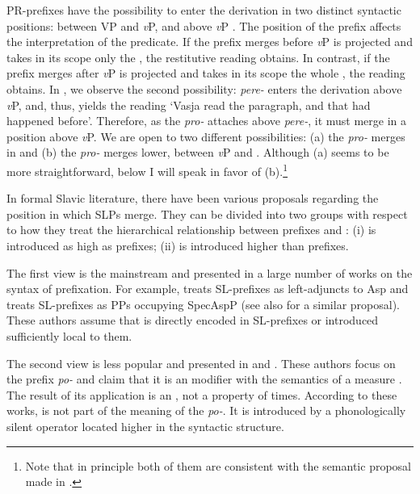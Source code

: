 \documentclass[output=paper,colorlinks,citecolor=brown,newtxmath]{langsci/langscibook}
\begin{document}
\noindent PR-prefixes have the possibility to enter the derivation in two distinct syntactic positions: between VP and \textit{v}P, and above \textit{v}P \citep{tatevosov2008intermediate}. The position of the prefix affects the interpretation of the predicate. If the prefix merges before \textit{v}P is projected and takes in its scope only the , the restitutive reading obtains. In contrast, if the prefix merges after \textit{v}P is projected and takes in its scope the whole , the  reading obtains. In , we observe the second possibility: \textit{pere-} enters the derivation above \textit{v}P, and, thus, yields the  reading `Vasja read the paragraph, and that had happened before'. Therefore, as the  \textit{pro-} attaches above \textit{pere-}, it must merge in a position above \textit{v}P. We are open to two different possibilities: (a) the  \textit{pro-} merges in  and (b) the  \textit{pro-} merges lower, between \textit{v}P and . Although (a) seems to be more straightforward, below I will speak in favor of (b).\footnote{Note that in principle both of them are consistent with the semantic proposal made in .}

In formal Slavic literature, there have been various proposals regarding the position in which SLPs merge. They can be divided into two groups with respect to how they treat the hierarchical relationship between prefixes and : (i)  is introduced as high as prefixes; (ii)  is introduced higher than prefixes.

The first view is the mainstream and presented in a large number of works on the syntax of prefixation. For example, \cite{babko1999zero} treats SL-prefixes as left-adjuncts to Asp and \cite{svenonius2004slavic} treats SL-prefixes as PPs occupying SpecAspP (see also \citealt{ramchand2005time} for a similar proposal). These authors assume that  is directly encoded in SL-prefixes or introduced sufficiently local to them.

The second view is less popular and presented in \citet{pinon1994} and \citet{filip2000quantization, filip2005measures,filip2008events}. These authors focus on the  prefix \textit{po-} and claim that it is an  modifier with the semantics of a measure . The result of its application is an , not a property of times. According to these works,  is not part of the meaning of the  \textit{po-}. It is introduced by a phonologically silent operator located higher in the syntactic structure.
\end{document}
